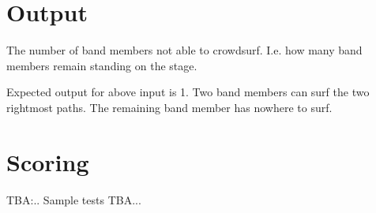 \section*{Output}

The number of band members not able to crowdsurf. I.e. how many band members remain standing on the stage.

Expected output for above input is 1. Two band members can surf the two rightmost paths. The remaining band member has nowhere to surf.

\section*{Scoring}

TBA:..
Sample tests TBA...

